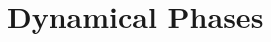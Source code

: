 \documentclass[prb,aps,twocolumn,superscriptaddress,floatfix]{revtex4-1}
\newcommand{\aleadd}[1]{{\color{blue}#1}}
\newcommand{\fabriq}[1]{{\color{red!60!blue}#1}}
\newcommand{\luzcom}[1]{{\color{green!50!black}#1}}
\begin{document}












\section{Dynamical Phases}

\end{document}
